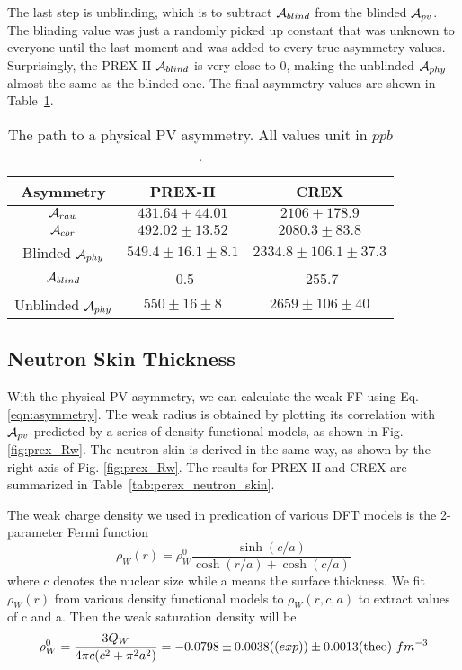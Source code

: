 The last step is unblinding, which is to subtract $\mathcal{A}_{blind}$ from the blinded
$\mathcal{A}_{pv}$. The blinding value was just a randomly picked up constant that was unknown to
everyone until the last moment and was added to every true asymmetry values. 
Surprisingly, the PREX-II $\mathcal{A}_{blind}$ is very close to 0, making the unblinded
$\mathcal{A}_{phy}$ almost the same as the blinded one. The final asymmetry values are
shown in Table~\ref{tab:pcrex_final_number}.
\begin{table}
    \centering
    \begin{tabular}{c | c c}
	\hline
	Asymmetry   & PREX-II	& CREX	\\
	\hline
	$\mathcal{A}_{raw}$ & $431.64 \pm 44.01$    & $2106 \pm 178.9$	\\
	$\mathcal{A}_{cor}$ & $492.02 \pm 13.52$    & $2080.3 \pm 83.8$	\\
	Blinded $\mathcal{A}_{phy}$ & $549.4 \pm 16.1 \pm 8.1$    & $2334.8 \pm 106.1 \pm 37.3$	\\
	$\mathcal{A}_{blind}$	& -0.5	& -255.7    \\
	\hline
	Unblinded $\mathcal{A}_{phy}$	& $550 \pm 16 \pm 8$	& $2659 \pm 106 \pm 40$	\\
	\hline
    \end{tabular}
    \caption{The path to a physical PV asymmetry. All values unit in $ppb$.}
    \label{tab:pcrex_final_number}
\end{table}

\subsection{Neutron Skin Thickness}
With the physical PV asymmetry, we can calculate the weak FF using Eq. \ref{eqn:asymmetry}.
The weak radius is obtained by plotting its correlation with $\mathcal{A}_{pv}$ predicted
by a series of density functional models, as shown in Fig. \ref{fig:prex_Rw}. The neutron
skin is derived in the same way, as shown by the right axis of Fig. \ref{fig:prex_Rw}.
The results for PREX-II and CREX are summarized in Table~\ref{tab:pcrex_neutron_skin}.

The weak charge density we used in predication of various DFT models is the 2-parameter
Fermi function
\begin{equation*}
    \rho_W(r) = \rho_W^0 \frac{\sinh(c/a)}{\cosh(r/a) + \cosh(c/a)}
\end{equation*}
where c denotes the nuclear size while a means the surface thickness. We fit $\rho_W(r)$
from various density functional models to $\rho_W(r, c, a)$ to extract values of
c and a. Then the weak saturation density will be
\begin{equation}
    \rho_W^0 = \frac{3Q_W}{4\pi c (c^2 + \pi^2 a^2)} 
    = -0.0798 \pm 0.0038 (\text(exp)) \pm 0.0013 (\text{theo})\ fm^{-3}
\end{equation}

